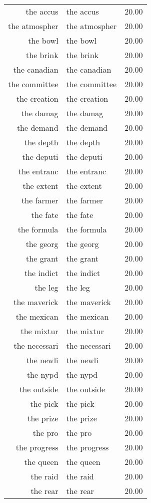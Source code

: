 \begin{table}[ht]
\begin{tabular}{rlr}
  the accus & the accus & 20.00 \\ 
  the atmospher & the atmospher & 20.00 \\ 
  the bowl & the bowl & 20.00 \\ 
  the brink & the brink & 20.00 \\ 
  the canadian & the canadian & 20.00 \\ 
  the committee & the committee & 20.00 \\ 
  the creation & the creation & 20.00 \\ 
  the damag & the damag & 20.00 \\ 
  the demand & the demand & 20.00 \\ 
  the depth & the depth & 20.00 \\ 
  the deputi & the deputi & 20.00 \\ 
  the entranc & the entranc & 20.00 \\ 
  the extent & the extent & 20.00 \\ 
  the farmer & the farmer & 20.00 \\ 
  the fate & the fate & 20.00 \\ 
  the formula & the formula & 20.00 \\ 
  the georg & the georg & 20.00 \\ 
  the grant & the grant & 20.00 \\ 
  the indict & the indict & 20.00 \\ 
  the leg & the leg & 20.00 \\ 
  the maverick & the maverick & 20.00 \\ 
  the mexican & the mexican & 20.00 \\ 
  the mixtur & the mixtur & 20.00 \\ 
  the necessari & the necessari & 20.00 \\ 
  the newli & the newli & 20.00 \\ 
  the nypd & the nypd & 20.00 \\ 
  the outside & the outside & 20.00 \\ 
  the pick & the pick & 20.00 \\ 
  the prize & the prize & 20.00 \\ 
  the pro & the pro & 20.00 \\ 
  the progress & the progress & 20.00 \\ 
  the queen & the queen & 20.00 \\ 
  the raid & the raid & 20.00 \\ 
  the rear & the rear & 20.00 \\ 

\end{tabular}
\end{table}
